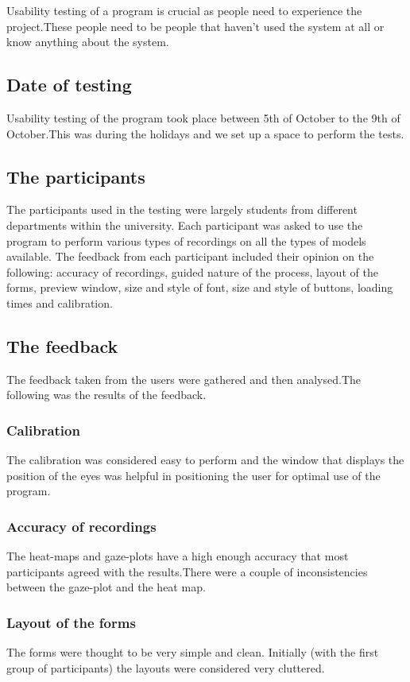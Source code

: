 Usability testing of a program is crucial as people need to experience the project.These people need to be people that haven't used the system at all or know anything about the system.

\subsection{Date of testing}
Usability testing of the program took place between 5th of October to the 9th of October.This was during the holidays and we set up a space to perform the tests.

\subsection{The participants}
The participants used in the testing were largely students from different departments within the university. Each participant was asked to use the program to perform various types of recordings on all the types of models available. The feedback from each participant included their opinion on the following: accuracy of recordings, guided nature of the process, layout of the forms, preview window, size and style of font, size and style of buttons, loading times and calibration.

\subsection{The feedback}
The feedback taken from the users were gathered and then analysed.The following was the results of the feedback.

\subsubsection{Calibration}
The calibration was considered easy to perform and the window that displays the position of the eyes was helpful in positioning the user for optimal use of the program.

\subsubsection{Accuracy of recordings}
The heat-maps and gaze-plots have a high enough accuracy that most participants agreed with the results.There were a couple of inconsistencies between the gaze-plot and the heat map.

\subsubsection{Layout of the forms}
The forms were thought to be very simple and clean. Initially (with the first group of participants) the layouts were considered very cluttered.

